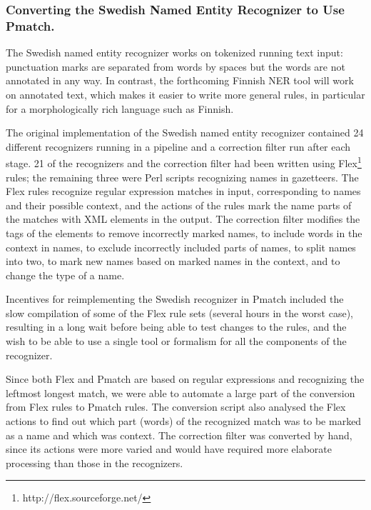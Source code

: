\documentclass{llncs}
\begin{document}
\subsubsection{Converting the Swedish Named Entity Recognizer to Use
  Pmatch.}

The Swedish named entity recognizer works on tokenized running text
input: punctuation marks are separated from words by spaces but the
words are not annotated in any way. In contrast, the forthcoming
Finnish NER tool will work on annotated text, which makes it easier to
write more general rules, in particular for a morphologically rich
language such as Finnish.

The original implementation of the Swedish named entity recognizer
\cite{kokkinakis/2003} contained 24 different recognizers running in a
pipeline and a correction filter run after each stage. 21 of the
recognizers and the correction filter had been written using
Flex\footnote{http://flex.sourceforge.net/} rules; the remaining three
were Perl scripts recognizing names in gazetteers. The Flex rules
recognize regular expression matches in input, corresponding to names
and their possible context, and the actions of the rules mark the name
parts of the matches with XML elements in the output. The correction
filter modifies
the tags of the elements to remove incorrectly marked names, to
include words in the context in names, to exclude incorrectly included
parts of names, to split names into two, to mark new names based on
marked names in the context, and to change the type of a name.

Incentives for reimplementing the Swedish recognizer in Pmatch
included the slow compilation of some of the Flex rule sets (several
hours in the worst case), resulting in a long wait before being able to
test changes to the rules, and the wish to be able to use a single
tool or
formalism for all the components of the recognizer.

Since both Flex and Pmatch are based on regular expressions and
recognizing the leftmost longest match, we were able to automate a
large part of the conversion from Flex rules to Pmatch rules. The
conversion script also analysed the Flex actions to find out which
part (words) of the recognized match was to be marked as a name and
which was context. The correction filter was converted by hand, since
its actions were more varied and would have required more elaborate
processing than those in the recognizers.
\end{document}

